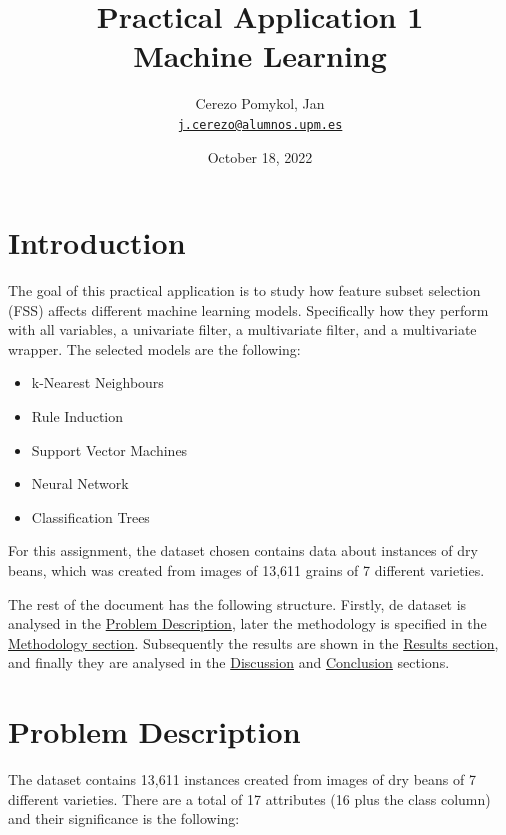 \documentclass[a4paper,11pt]{article}
\author{
	\Large Cerezo Pomykol, Jan\\ \href{mailto:j.cerezo@alumnos.upm.es}{\small\texttt{j.cerezo@alumnos.upm.es}}
}
\title{\textbf{\Huge Practical Application 1} \\
		\Large Machine Learning}
\date{\Large October 18, 2022}
\begin{document}
\maketitle
\vfill

\tableofcontents
\newpage

\section{Introduction}
\label{sec:introduction}

The goal of this practical application is to study how feature subset selection (FSS) affects different machine learning models. Specifically how they perform with all variables, a univariate filter, a multivariate filter, and a multivariate wrapper. The selected models are the following:

\begin{itemize}
\item k-Nearest Neighbours
\item Rule Induction
\item Support Vector Machines
\item Neural Network
\item Classification Trees
\end{itemize}

For this assignment, the dataset chosen \cite{misc_dry_bean_dataset_602}\cite{KOKLU2020105507} contains data about instances of dry beans, which was created from images of 13,611 grains of 7 different varieties.

The rest of the document has the following structure. Firstly, de dataset is analysed in the \hyperref[sec:problem]{Problem Description}, later the methodology is specified in the \hyperref[sec:methodology]{Methodology section}. Subsequently the results are shown in the \hyperref[sec:results]{Results section}, and finally they are analysed in the \hyperref[sec:discussion]{Discussion} and \hyperref[sec:conclusion]{Conclusion} sections.

\section{Problem Description}
\label{sec:problem}

The dataset contains 13,611 instances created from images of dry beans of 7 different varieties. There are a total of 17 attributes (16 plus the class column) and their significance is the following:
\end{document}
